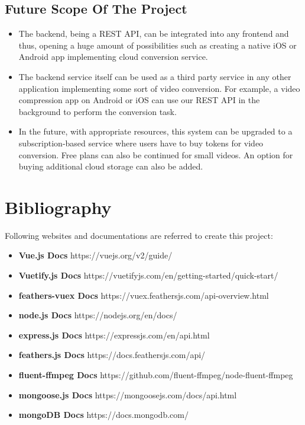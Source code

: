\subsection{Future Scope Of The Project}
\begin{itemize}
	\item The backend, being a REST API, can be integrated into any frontend and thus, opening a huge amount of possibilities such as creating a native iOS or Android app implementing cloud conversion service.
	
	\item The backend service itself can be used as a third party service in any other application implementing some sort of video conversion. For example, a video compression app on Android or iOS can use our REST API in the background to perform the conversion task.
	
	\item In the future, with appropriate resources, this system can be upgraded to a subscription-based service where users have to buy tokens for video conversion. Free plans can also be continued for small videos. An option for buying additional cloud storage can also be added.
\end{itemize}
		\pagebreak
\section{Bibliography}
\vs
Following websites and documentations are referred to create this project: 
\begin{itemize}
	\item 
	\textbf{Vue.js Docs} https://vuejs.org/v2/guide/
	\item 
	\textbf{Vuetify.js Docs} https://vuetifyjs.com/en/getting-started/quick-start/
	\item
	\textbf{feathers-vuex Docs} https://vuex.feathersjs.com/api-overview.html
	\item
	\textbf{node.js Docs} https://nodejs.org/en/docs/
	\item
	\textbf{express.js Docs} https://expressjs.com/en/api.html
	\item
	\textbf{feathers.js Docs} https://docs.feathersjs.com/api/
	\item 
	\textbf{fluent-ffmpeg Docs} https://github.com/fluent-ffmpeg/node-fluent-ffmpeg
	\item 
	\textbf{mongoose.js Docs} https://mongoosejs.com/docs/api.html
	\item 
	\textbf{mongoDB Docs} https://docs.mongodb.com/
\end{itemize}
		\pagebreak
